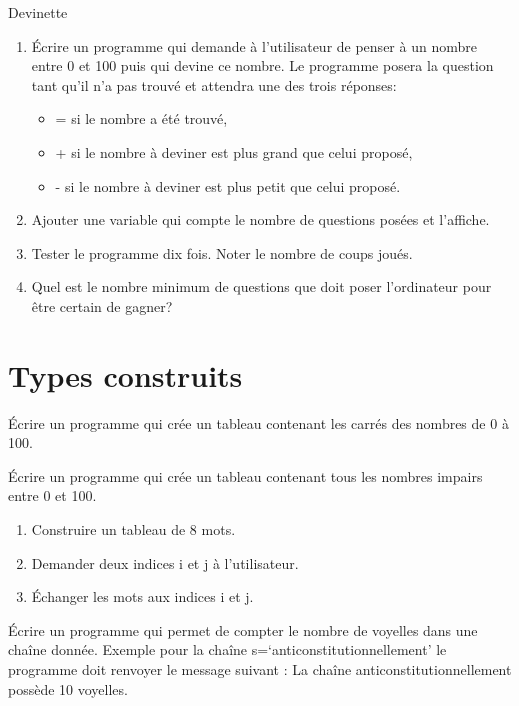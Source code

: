 \documentclass[a4paper,11pt]{article}
\begin{document}
\begin{Form}
\begin{exo}
\begin{enumerate}
\end{enumerate}
\end{exo}
\begin{exo}
Devinette
\begin{enumerate}
\item Écrire un programme qui demande à l'utilisateur de penser à un nombre entre 0 et 100 puis qui devine ce nombre. Le programme posera la question  tant qu'il n'a pas trouvé et attendra une des trois réponses:
\begin{itemize}
\item = si le nombre a été trouvé,
\item + si le nombre à deviner est plus grand que celui proposé,
\item - si le nombre à deviner est plus petit que celui proposé.
\end{itemize}
\item Ajouter une variable qui compte le nombre de questions posées et l'affiche.
\item Tester le programme dix fois. Noter le nombre de coups joués.
\item Quel est le nombre minimum de questions que doit poser l'ordinateur pour être certain de gagner? 
\end{enumerate}
\end{exo}
\section{Types construits}
\begin{exo}
Écrire un programme qui crée un tableau contenant les carrés des nombres de 0 à 100.
\end{exo}
\begin{exo}
Écrire un programme qui crée un tableau contenant tous les nombres impairs entre 0 et 100.
\end{exo}
\begin{exo}
\begin{enumerate}
\item Construire un tableau de 8 mots.
\item Demander deux indices i et j à l'utilisateur.
\item Échanger les mots aux indices i et j.
\end{enumerate}
\end{exo}
\begin{exo}
Écrire un programme qui permet de compter le nombre de voyelles dans une chaîne donnée. Exemple pour la chaîne s=‘anticonstitutionnellement’ le programme doit renvoyer le message suivant : La chaîne anticonstitutionnellement possède 10 voyelles.
\end{exo}
\end{Form}
\end{document}
